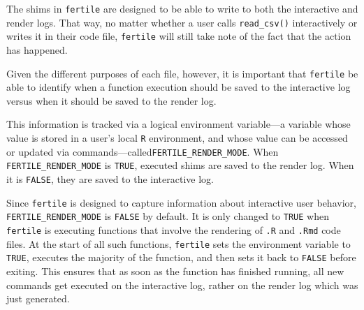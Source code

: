 \documentclass[12pt,twoside]{reedthesis}
\begin{document}
The shims in \texttt{fertile} are designed to be able to write to both the interactive and render logs. That way, no matter whether a user calls \texttt{read\_csv()} interactively or writes it in their code file, \texttt{fertile} will still take note of the fact that the action has happened.

Given the different purposes of each file, however, it is important that \texttt{fertile} be able to identify when a function execution should be saved to the interactive log versus when it should be saved to the render log.

This information is tracked via a logical environment variable---a variable whose value is stored in a user's local \texttt{R} environment, and whose value can be accessed or updated via commands---called\texttt{FERTILE\_RENDER\_MODE}. When \texttt{FERTILE\_RENDER\_MODE} is \texttt{TRUE}, executed shims are saved to the render log. When it is \texttt{FALSE}, they are saved to the interactive log.

Since \texttt{fertile} is designed to capture information about interactive user behavior, \texttt{FERTILE\_RENDER\_MODE} is \texttt{FALSE} by default. It is only changed to \texttt{TRUE} when \texttt{fertile} is executing functions that involve the rendering of \texttt{.R} and \texttt{.Rmd} code files. At the start of all such functions, \texttt{fertile} sets the environment variable to \texttt{TRUE}, executes the majority of the function, and then sets it back to \texttt{FALSE} before exiting. This ensures that as soon as the function has finished running, all new commands get executed on the interactive log, rather on the render log which was just generated.
\end{document}
